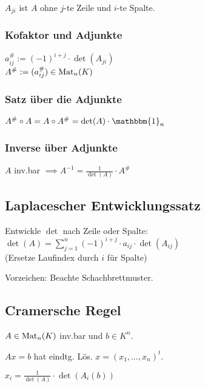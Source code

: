 $A_{ji}$ ist $A$ ohne $j$-te Zeile und $i$-te Spalte.

\subsubsection*{Kofaktor und Adjunkte}
$a^\#_{ij} := (-1)^{i+j}\cdot\det(A_{ji})$ \\
$A^\# := (a^\#_{ij})\in\operatorname{Mat}_n(K)$

\subsubsection*{Satz über die Adjunkte}
$A^\# \circ A = A \circ A^\# = \det(A) \cdot \mathbbm{1}_n$

\subsubsection*{Inverse über Adjunkte}
$A$ inv.bar $\implies A^{-1}=\frac{1}{\det(A)}\cdot A^\#$

\subsection*{Laplacescher Entwicklungssatz}
Entwickle $\det$ nach Zeile oder Spalte:
$\displaystyle \det(A)=\sum_{j=1}^n(-1)^{i+j}\cdot a_{ij} \cdot \det(A_{ij})$ \\
(Ersetze Laufindex durch $i$ für Spalte)

Vorzeichen: Beachte Schachbrettmuster.

\subsection*{Cramersche Regel}
$A\in\operatorname{Mat}_n(K)$ inv.bar und $b\in K^n$.

$Ax=b$ hat eindtg. Lös. $x=(x_1,\dots,x_n)^t$.

$x_i = \frac{1}{\det(A)}\cdot\det(A_i(b))$
